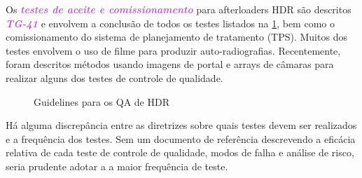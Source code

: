 \documentclass[11pt,a4paper]{article}
\begin{document}
	Os \textcolor{MediumOrchid}{\textbf{\textit{testes de aceite e comissionamento}}} para afterloaders HDR são descritos \textcolor{MediumOrchid}{\textbf{\textit{TG-41}}} e envolvem a conclusão de todos os testes listados na \ref{fig:hdrguidelines}, bem como o comissionamento do sistema de planejamento de tratamento (TPS). Muitos dos testes envolvem o uso de filme para produzir auto-radiografias. Recentemente, foram descritos métodos usando imagens de portal e arrays de câmaras para realizar alguns dos testes de controle de qualidade. 


	\begin{figure}[!h]
		\centering
		\caption{Guidelines para os QA de HDR}
		\label{fig:hdrguidelines}
	\end{figure}

	Há alguma discrepância entre as diretrizes sobre quais testes devem ser realizados e a frequência dos testes. Sem um documento de referência descrevendo a eficácia relativa de cada teste de controle de qualidade, modos de falha e análise de risco, seria prudente adotar a a maior frequência de teste.
\end{document}
